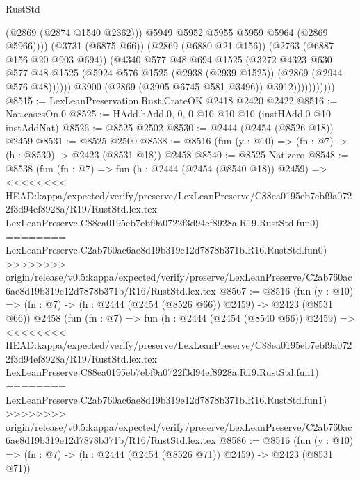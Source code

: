 \begin{lexlean}{RustStd}
\begin{coremodule}
{\begin{coremodule}
{{{{{{{{{{{{                                    (@2869 (@2874 @1540 @2362)))
                                  @5949
                                  @5952
                                  @5955
                                  @5959
                                  @5964
                                  (@2869 @5966))))
                            (@3731 (@6875 @66))
                            (@2869 (@6880 @21 @156))
                            (@2763 (@6887 @156 @20 @903 @694))
                            (@4340
                              @577
                              @48
                              @694
                              @1525
                              (@3272
                                @4323
                                @630
                                @577
                                @48
                                @1525
                                (@5924 @576 @1525 (@2938 (@2939 @1525)) (@2869 (@2944 @576 @48))))))
                          @3900
                          (@2869 (@3905 @6745 @581 @3496))
                          @3912)))))))))))
@8515 := LexLeanPreservation.Rust.CrateOK @2418 @2420 @2422
@8516 := Nat.casesOn.{0}
@8525 := HAdd.hAdd.{0, 0, 0} @10 @10 @10 (instHAdd.{0} @10 instAddNat)
@8526 := @8525 @2502
@8530 := @2444 (@2454 (@8526 @18)) @2459
@8531 := @8525 @2500
@8538 := @8516 (fun (y : @10) => (fn : @7) -> (h : @8530) -> @2423 (@8531 @18)) @2458
@8540 := @8525 Nat.zero
@8548 := @8538
    (fun (fn : @7) =>
    fun (h : @2444 (@2454 (@8540 @18)) @2459) =>
<<<<<<<< HEAD:kappa/expected/verify/preserve/LexLeanPreserve/C88ea0195eb7ebf9a0722f3d94ef8928a/R19/RustStd.lex.tex
    LexLeanPreserve.C88ea0195eb7ebf9a0722f3d94ef8928a.R19.RustStd.fun0)
========
    LexLeanPreserve.C2ab760ac6ae8d19b319e12d7878b371b.R16.RustStd.fun0)
>>>>>>>> origin/release/v0.5:kappa/expected/verify/preserve/LexLeanPreserve/C2ab760ac6ae8d19b319e12d7878b371b/R16/RustStd.lex.tex
@8567 := @8516
    (fun (y : @10) => (fn : @7) -> (h : @2444 (@2454 (@8526 @66)) @2459) -> @2423 (@8531 @66))
    @2458
    (fun (fn : @7) =>
    fun (h : @2444 (@2454 (@8540 @66)) @2459) =>
<<<<<<<< HEAD:kappa/expected/verify/preserve/LexLeanPreserve/C88ea0195eb7ebf9a0722f3d94ef8928a/R19/RustStd.lex.tex
    LexLeanPreserve.C88ea0195eb7ebf9a0722f3d94ef8928a.R19.RustStd.fun1)
========
    LexLeanPreserve.C2ab760ac6ae8d19b319e12d7878b371b.R16.RustStd.fun1)
>>>>>>>> origin/release/v0.5:kappa/expected/verify/preserve/LexLeanPreserve/C2ab760ac6ae8d19b319e12d7878b371b/R16/RustStd.lex.tex
@8586 := @8516
    (fun (y : @10) => (fn : @7) -> (h : @2444 (@2454 (@8526 @71)) @2459) -> @2423 (@8531 @71))
}}}}}}}}}}}}
\end{coremodule}}
\end{coremodule}
\end{lexlean}
